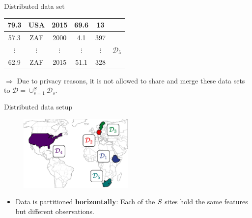 \documentclass[t,10pt]{beamer}
\begin{document}
\begin{frame}{Distributed data set}
{\begin{table}
\begin{tabular}[t]{cccccc}
    79.3 & {\color{lightgray}USA} & 2015 & 69.6 & 13\\ \hline
    57.3 & {\color{lightgray}ZAF} & 2000 & 4.1 & 397 & \multirow{3}{*}{\color[HTML]{008280}\normalsize$\mathcal{D}_5$}\\
    {\tiny$\vdots$} & {\tiny\color{lightgray}$\vdots$} & {\tiny$\vdots$} & {\tiny$\vdots$} & {\tiny$\vdots$}\\
    62.9 & {\color{lightgray}ZAF} & 2015 & 51.1 & 328\\
  \bottomrule
  \end{tabular}
  \end{table}}
  $\Rightarrow$ Due to privacy reasons, it is not allowed to share and merge these data sets to $\mathcal{D} = \cup_{s=1}^S \mathcal{D}_s$.
\end{frame}

\begin{frame}{Distributed data setup}
  \begin{figure}
    \centering
    \includegraphics[width=0.5\textwidth]{figures/weltkarte.png}
  \end{figure}
  \begin{itemize}
    \item Data is partitioned \textbf{horizontally}: Each of the $S$ sites hold the same features but different observations.
  \end{itemize}
\end{frame}
\end{document}
